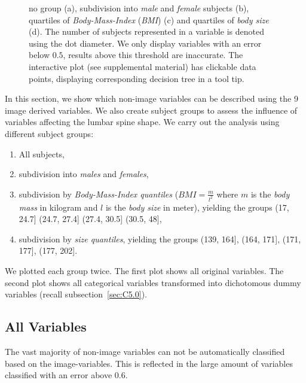 \documentclass[a4paper,twoside]{style/article}
\begin{document}
\begin{figure}[p!]
{no group (a), subdivision into \emph{male} and \emph{female} subjects (b), quartiles of \emph{Body-Mass-Index} (\emph{BMI}) (c) and quartiles of \emph{body size} (d).
The number of subjects represented in a variable is denoted using the dot diameter.
We only display variables with an error below $0.5$, results above this threshold are inaccurate.
The interactive plot (see supplemental material) has clickable data points, displaying corresponding decision tree in a tool tip.
}
  \label{fig:results}
\end{figure}
\noindent In this section, we show which non-image variables can be described using the 9 image derived variables.
We also create subject groups to assess the influence of variables affecting the lumbar spine shape.
We carry out the analysis using different subject groups:
\begin{enumerate}
	\item All subjects,
	\item subdivision into \emph{males} and \emph{females},
	\item subdivision by \emph{Body-Mass-Index quantiles} ($BMI = \frac{m}{l^2}$ where $m$ is the \emph{body mass} in kilogram and $l$ is the \emph{body size} in meter), yielding the groups (17, 24.7] (24.7, 27.4] (27.4, 30.5] (30.5, 48],
	\item subdivision by \emph{size quantiles}, yielding the groups (139, 164], (164, 171], (171, 177], (177, 202].
\end{enumerate}
We plotted each group twice.
The first plot shows all original variables.
The second plot shows all categorical variables transformed into dichotomous dummy variables (recall subsection~\ref{sec:C5.0}).

\subsection{All Variables}
The vast majority of non-image variables can not be automatically classified based on the image-variables.
This is reflected in the large amount of variables classified with an error above $0.6$.
\end{document}
